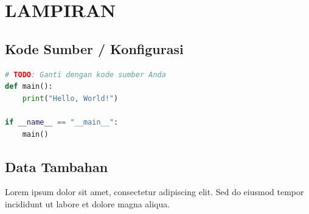 \chapter{LAMPIRAN}

\section{Kode Sumber / Konfigurasi}


\begin{lstlisting}[language=python, caption={Contoh Kode Program}]
# TODO: Ganti dengan kode sumber Anda
def main():
    print("Hello, World!")
    
if __name__ == "__main__":
    main()
\end{lstlisting}

\section{Data Tambahan}


Lorem ipsum dolor sit amet, consectetur adipiscing elit. Sed do eiusmod tempor incididunt ut labore et dolore magna aliqua.
